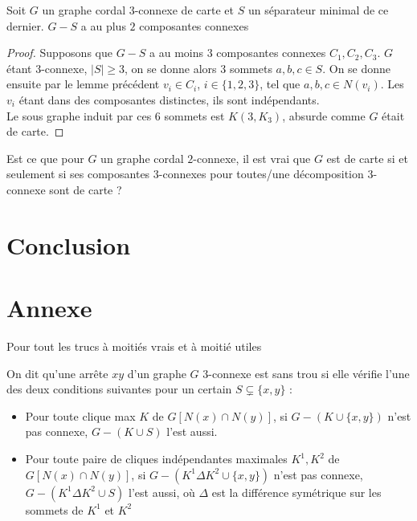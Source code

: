\documentclass{scrartcl}
\begin{document}
\begin{flushleft}
\begin{cor}
    Soit $G$ un graphe cordal $3$-connexe de carte et $S$ un séparateur minimal de ce dernier. $G - S$ a au plus $2$ composantes
    connexes
\end{cor}

\begin{proof}
    Supposons que $G - S$ a au moins $3$ composantes connexes $C_1, C_2, C_3$. $G$ étant $3$-connexe, $|S| \geq 3$, on se donne
    alors $3$ sommets $a,b,c \in S$. On se donne ensuite par le lemme précédent $v_i \in C_i$, $i \in \{1,2,3\}$, tel que
    $a,b,c \in N(v_i)$. Les $v_i$ étant dans des composantes distinctes, ils sont indépendants.\\
    Le sous graphe induit par ces $6$ sommets est $K(3, K_3)$, absurde comme $G$ était de carte.
\end{proof}

\begin{quest}
    Est ce que pour $G$ un graphe cordal $2$-connexe, il est vrai que $G$ est de carte si et seulement si ses composantes $3$-connexes pour
    toutes/une décomposition $3$-connexe sont de carte ?
\end{quest}

\section*{Conclusion}

\section*{Annexe}

Pour tout les trucs à moitiés vrais et à moitié utiles


\begin{def*}
    On dit qu'une arrête $xy$ d'un graphe $G$ $3$-connexe est sans trou si elle vérifie l'une des deux conditions suivantes pour un certain
    $S \subsetneq \{x, y\}$ :
    \begin{itemize}
        \item Pour toute clique max $K$ de $G[N(x) \cap N(y)]$, si $G - (K \cup \{x,y\})$ n'est pas connexe, $G - (K \cup S)$ l'est aussi.
        \item Pour toute paire de cliques indépendantes maximales $K^1, K^2$ de $G[N(x) \cap N(y)]$, si $G - (K^1 \Delta K^2 \cup \{x,y\})$ n'est pas connexe,
        $G - (K^1 \Delta K^2 \cup S)$ l'est aussi, où $\Delta$ est la différence symétrique sur les sommets de $K^1$ et $K^2$
    \end{itemize}
\end{def*}


\end{flushleft}
\end{document}
